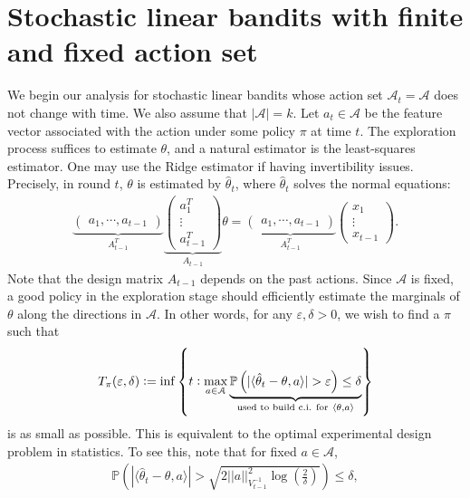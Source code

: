 \documentclass[letterpaper,10pt,openright,openany]{book}
\numberwithin{equation}{section}
\theoremstyle{plain}
\theoremstyle{definition}
\def\P{{\mathbb P}}
\def\e{{\varepsilon}}
\def\t{{\theta}}
\begin{document}
\section{Stochastic linear bandits with finite and fixed action set}

We begin our analysis for stochastic linear bandits whose action set $\mathcal A_t = \mathcal A$ does not change with time. We also assume that $|\mathcal A|=k$. Let $a_t\in\mathcal A$ be the feature vector associated with the action under some policy $\pi$ at time $t$. The exploration process suffices to estimate $\t$, and a natural estimator is the least-squares estimator. One may use the Ridge estimator if having invertibility issues. Precisely, in round $t$, $\t$ is estimated by $\hat{\t}_t$, where $\hat{\t}_t $ solves the normal equations: 
\begin{align*}
\underbrace{\begin{pmatrix}
a_1, \cdots, a_{t-1}
\end{pmatrix}}_{A^T_{t-1}}\underbrace{\begin{pmatrix}
a_1^T \\
\vdots \\
a_{t-1}^T
\end{pmatrix}}_{A_{t-1}}\t = \underbrace{\begin{pmatrix}
a_1, \cdots, a_{t-1}
\end{pmatrix}}_{A^T_{t-1}}\begin{pmatrix}
x_1 \\
\vdots \\
x_{t-1}
\end{pmatrix}.
\end{align*}
Note that the design matrix $A_{t-1}$ depends on the past actions. Since $\mathcal A$ is fixed, a good policy in the exploration stage should efficiently estimate the marginals of $\t$ along the directions in $\mathcal A$. In other words, for any $\e, \delta>0$, we wish to find a $\pi$ such that 
\begin{align}
T_{\pi}(\e, \delta):=\inf\left\{t: \max_{a\in\mathcal A}\underbrace{\P\left(|\langle\hat{\t}_t-\t, a\rangle|>\e\right)\leq\delta}_{\textcolor{black}{\text{used to build c.i. for}\ \langle\t, a\rangle}}\right\}\label{sl:5}
\end{align}
is as small as possible. This is equivalent to the optimal experimental design problem in statistics. 
To see this, note that for fixed $a\in\mathcal A$, 
\begin{align*}
\P\left(|\langle\hat{\t}_t-\t, a\rangle|>\sqrt{2||a||^2_{V_{t-1}^{-1}}\log\left(\frac{2}{\delta}\right)}\right)\leq\delta,
\end{align*}
\end{document}
